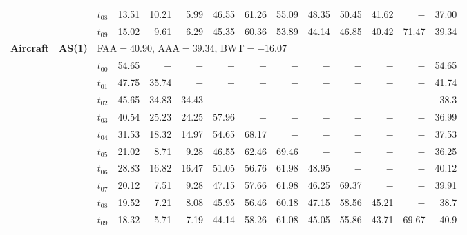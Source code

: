 \begin{table}[ht]
\begin{tabular}{@{}l l l *{11}{r}@{}}
 & & $t_{08}$ & 13.51 & 10.21 & 5.99 & 46.55 & 61.26 & 55.09 & 48.35 & 50.45 & 41.62 & $-$ & 37.00 \\
 & & $t_{09}$ & 15.02 & 9.61 & 6.29 & 45.35 & 60.36 & 53.89 & 44.14 & 46.85 & 40.42 & 71.47 & 39.34 \\
\midrule
\multirow{11}{*}{\textbf{Aircraft}} & \multirow{11}{*}{\textbf{AS(1)}} & \multicolumn{12}{l}{\quad\small FAA$=40.90$,\; AAA$=39.34$,\; BWT$=-16.07$} \\
 & & $t_{00}$ & 54.65 & $-$ & $-$ & $-$ & $-$ & $-$ & $-$ & $-$ & $-$ & $-$ & 54.65 \\
 & & $t_{01}$ & 47.75 & 35.74 & $-$ & $-$ & $-$ & $-$ & $-$ & $-$ & $-$ & $-$ & 41.74 \\
 & & $t_{02}$ & 45.65 & 34.83 & 34.43 & $-$ & $-$ & $-$ & $-$ & $-$ & $-$ & $-$ & 38.3 \\
 & & $t_{03}$ & 40.54 & 25.23 & 24.25 & 57.96 & $-$ & $-$ & $-$ & $-$ & $-$ & $-$ & 36.99 \\
 & & $t_{04}$ & 31.53 & 18.32 & 14.97 & 54.65 & 68.17 & $-$ & $-$ & $-$ & $-$ & $-$ & 37.53 \\
 & & $t_{05}$ & 21.02 & 8.71 & 9.28 & 46.55 & 62.46 & 69.46 & $-$ & $-$ & $-$ & $-$ & 36.25 \\
 & & $t_{06}$ & 28.83 & 16.82 & 16.47 & 51.05 & 56.76 & 61.98 & 48.95 & $-$ & $-$ & $-$ & 40.12 \\
 & & $t_{07}$ & 20.12 & 7.51 & 9.28 & 47.15 & 57.66 & 61.98 & 46.25 & 69.37 & $-$ & $-$ & 39.91 \\
 & & $t_{08}$ & 19.52 & 7.21 & 8.08 & 45.95 & 56.46 & 60.18 & 47.15 & 58.56 & 45.21 & $-$ & 38.7 \\
 & & $t_{09}$ & 18.32 & 5.71 & 7.19 & 44.14 & 58.26 & 61.08 & 45.05 & 55.86 & 43.71 & 69.67 & 40.9 \\
\bottomrule
\end{tabular}
\end{table}
